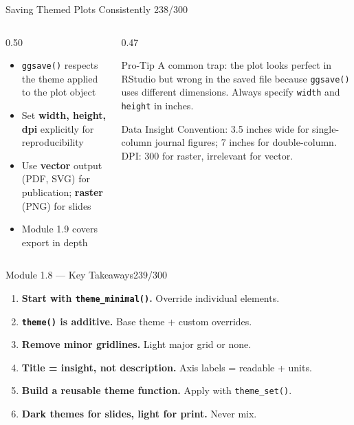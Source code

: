 \documentclass[10pt]{beamer}
\newcommand{\smark}[1]{\hfill{\scriptsize\color{codegray}#1}}
\begin{document}
\begin{frame}{Saving Themed Plots Consistently}
\smark{238/300}
\begin{columns}[T]
\begin{column}{0.50\textwidth}
\begin{itemize}
    \item \texttt{ggsave()} respects the theme applied to the plot object
    \item Set \textbf{width, height, dpi} explicitly for reproducibility
    \item Use \textbf{vector} output (PDF, SVG) for publication; \textbf{raster} (PNG) for slides
    \item Module 1.9 covers export in depth
\end{itemize}
\end{column}
\begin{column}{0.47\textwidth}
\begin{alertblock}{Pro-Tip}
    \scriptsize A common trap: the plot looks perfect in RStudio but wrong in the saved file because \texttt{ggsave()} uses different dimensions. Always specify \texttt{width} and \texttt{height} in inches.
\end{alertblock}
\vspace{0.2cm}
\begin{exampleblock}{Data Insight}
    \scriptsize Convention: 3.5 inches wide for single-column journal figures; 7 inches for double-column. DPI: 300 for raster, irrelevant for vector.
\end{exampleblock}
\end{column}
\end{columns}
\end{frame}

\begin{frame}{Module 1.8 --- Key Takeaways}\smark{239/300}
\begin{enumerate}
    \item \textbf{Start with \texttt{theme\_minimal()}.} Override individual elements.
    \item \textbf{\texttt{theme()} is additive.} Base theme $+$ custom overrides.
    \item \textbf{Remove minor gridlines.} Light major grid or none.
    \item \textbf{Title = insight, not description.} Axis labels = readable + units.
    \item \textbf{Build a reusable theme function.} Apply with \texttt{theme\_set()}.
    \item \textbf{Dark themes for slides, light for print.} Never mix.
\end{enumerate}
\end{frame}
\end{document}
